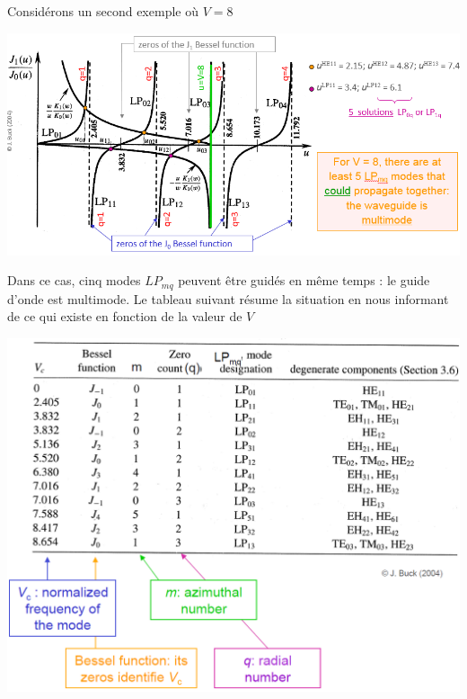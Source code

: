 Considérons un second exemple où $V=8$
\begin{center}
	\includegraphics[scale=0.64]{ch1/image23.png}
\end{center}
Dans ce cas, cinq modes $LP_{mq}$ peuvent être guidés en même temps : le guide d'onde est
multimode. Le tableau suivant résume la situation en nous informant de ce qui existe en fonction
de la valeur de $V$
\begin{center}
	\includegraphics[scale=0.45]{ch1/tab1.png}
\end{center}



